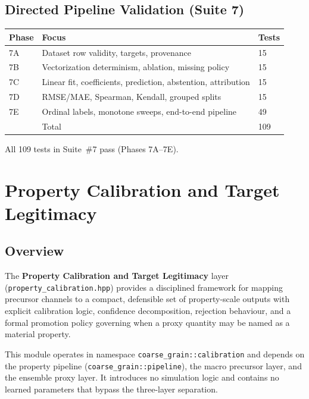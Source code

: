 \documentclass[11pt]{article}
\newcommand{\file}[1]{\texttt{#1}}
\newcommand{\ns}[1]{\texttt{#1}}
\begin{document}
\subsection{Directed Pipeline Validation (Suite 7)}

\begin{center}
\begin{tabular}{lll}
\textbf{Phase} & \textbf{Focus} & \textbf{Tests} \\
\hline
7A & Dataset row validity, targets, provenance & 15 \\
7B & Vectorization determinism, ablation, missing policy & 15 \\
7C & Linear fit, coefficients, prediction, abstention, attribution & 15 \\
7D & RMSE/MAE, Spearman, Kendall, grouped splits & 15 \\
7E & Ordinal labels, monotone sweeps, end-to-end pipeline & 49 \\
\hline
   & Total & 109 \\
\end{tabular}
\end{center}

All 109 tests in Suite~\#7 pass (Phases 7A--7E).

\section{Property Calibration and Target Legitimacy}
\label{sec:property-calibration}

\subsection{Overview}

The \textbf{Property Calibration and Target Legitimacy} layer
(\file{property\_calibration.hpp}) provides a disciplined framework for
mapping precursor channels to a compact, defensible set of property-scale
outputs with explicit calibration logic, confidence decomposition,
rejection behaviour, and a formal promotion policy governing when a proxy
quantity may be named as a material property.

This module operates in namespace \ns{coarse\_grain::calibration} and
depends on the property pipeline (\ns{coarse\_grain::pipeline}), the macro
precursor layer, and the ensemble proxy layer.  It introduces no simulation
logic and contains no learned parameters that bypass the three-layer
separation.
\end{document}
